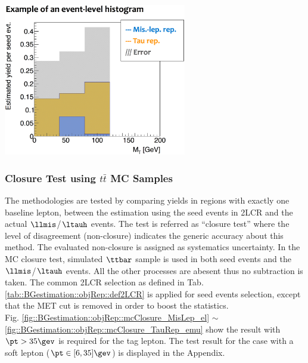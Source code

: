 \begin{center}
\includegraphics[width=80mm]{figures/BGestimation/ObjReplacement/method/evtLevel_histogram.eps}
\label{fig::BGestimation::objRep::evtLevelHist}
\end{center}


\clearpage
\subsubsection{Closure Test using $t\bar{t}$ MC Samples} \label{sec::BGestimation::objRep::mcClosure} 
The methodologies are tested by comparing yields in regions with exactly one baseline lepton, between the estimation using the seed events in 2LCR and the actual $\llmis$/$\ltauh$ events. 
The test is referred as ``closure test'' where the level of disagreement (non-closure) indicates the generic accuracy about this method. The evaluated non-closure is assigned as systematics uncertainty. 
In the MC closure test, simulated $\ttbar$ sample is used in both seed events and the $\llmis$/$\ltauh$ events. All the other processes are abesent thus no subtraction is taken.
The common 2LCR selection as defined in Tab. \ref{tab::BGestimation::objRep::def2LCR} is applied for seed events selection, except that the MET cut is removed in order to boost the statistics. \\

Fig. \ref{fig::BGestimation::objRep::mcClosure_MisLep_el} $\sim$ \ref{fig::BGestimation::objRep::mcClosure_TauRep_emu} show the result with $\pt>35\gev$ is required for the tag lepton. The test result for the case with a soft lepton ($\pt\in[6,35]\gev$) is displayed in the Appendix.

